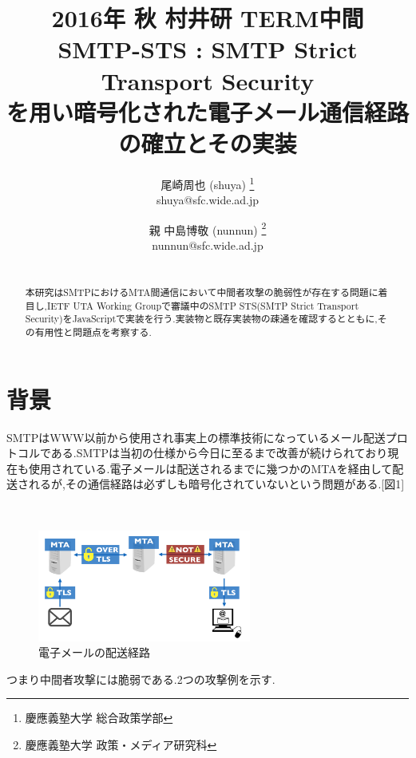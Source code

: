 \documentclass[a4j,10pt]{jsarticle}
\begin{document}

\title{2016年 秋 村井研 TERM中間\\
SMTP-STS : SMTP Strict Transport Security
\\を用い暗号化された電子メール通信経路の確立とその実装}

\author{
    尾崎周也 (shuya) \thanks{慶應義塾大学 総合政策学部}
    \\shuya@sfc.wide.ad.jp
    \and
    親 中島博敬 (nunnun) \thanks{慶應義塾大学 政策・メディア研究科}
    \\nunnun@sfc.wide.ad.jp
}


\begin{abstract}
\\
本研究はSMTPにおけるMTA間通信において中間者攻撃の脆弱性が存在する問題に着目し,IETF UTA Working Groupで審議中のSMTP STS(SMTP Strict Transport Security)\cite{draft}をJavaScriptで実装を行う.実装物と既存実装物の疎通を確認するとともに,その有用性と問題点を考察する.
\end{abstract}

\maketitle
\thispagestyle{empty}

\section{背景}

SMTPはWWW以前から使用され事実上の標準技術になっているメール配送プロトコルである.SMTPは当初の仕様から今日に至るまで改善が続けられており現在も使用されている.電子メールは配送されるまでに幾つかのMTAを経由して配送されるが,その通信経路は必ずしも暗号化されていないという問題がある.[図1]
\begin{figure}[htbp]
　\begin{center}
      \includegraphics[width=7cm]{figure1.png}
      \caption{電子メールの配送経路}
    \end{center}
\end{figure}

つまり中間者攻撃には脆弱である.2つの攻撃例を示す.
\end{document}
